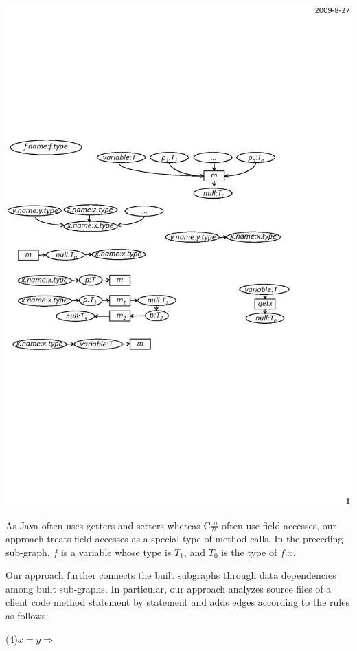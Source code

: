 \begin{center}
\includegraphics[scale=0.7,clip]{figure/rule3.eps}%
\end{center}

As Java often uses getters and setters whereas C\# often use field
accesses, our approach treats field accesses as a special type of
method calls. In the preceding sub-graph, $f$ is a variable whose
type is $T_1$, and $T_0$ is the type of $f.x$.


Our approach further connects the built subgraphs through data
dependencies among built sub-graphs. In particular, our approach
analyzes source files of a client code method statement by statement
and adds edges according to the rules as follows:

(4)$x=y \Rightarrow $

